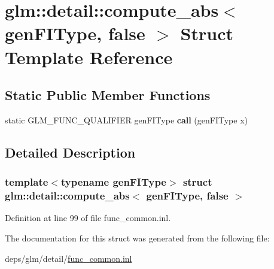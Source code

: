 \hypertarget{structglm_1_1detail_1_1compute__abs_3_01genFIType_00_01false_01_4}{}\section{glm\+:\+:detail\+:\+:compute\+\_\+abs$<$ gen\+F\+I\+Type, false $>$ Struct Template Reference}
\label{structglm_1_1detail_1_1compute__abs_3_01genFIType_00_01false_01_4}
\subsection*{Static Public Member Functions}
\begin{DoxyCompactItemize}
\item 
\mbox{\label{structglm_1_1detail_1_1compute__abs_3_01genFIType_00_01false_01_4_acc50915fdea0a19f047f019081c56dcc}} 
static G\+L\+M\+\_\+\+F\+U\+N\+C\+\_\+\+Q\+U\+A\+L\+I\+F\+I\+ER gen\+F\+I\+Type {\bfseries call} (gen\+F\+I\+Type x)
\end{DoxyCompactItemize}


\subsection{Detailed Description}
\subsubsection*{template$<$typename gen\+F\+I\+Type$>$\newline
struct glm\+::detail\+::compute\+\_\+abs$<$ gen\+F\+I\+Type, false $>$}



Definition at line 99 of file func\+\_\+common.\+inl.



The documentation for this struct was generated from the following file\+:\begin{DoxyCompactItemize}
\item 
deps/glm/detail/\hyperlink{func__common_8inl}{func\+\_\+common.\+inl}\end{DoxyCompactItemize}
